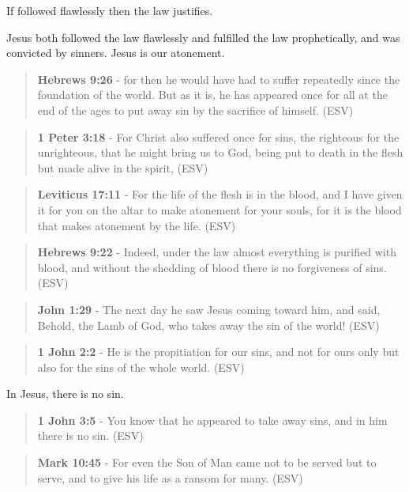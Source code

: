 \documentclass[11pt]{article}
\begin{document}
If followed flawlessly then the law justifies.

Jesus both followed the law flawlessly and fulfilled the law prophetically, and was convicted by sinners. Jesus is our atonement.

\begin{quote}
\textbf{Hebrews 9:26} - for then he would have had to suffer repeatedly since the foundation of the world.  But as it is, he has appeared once for all at the end of the ages to put away sin by the sacrifice of himself.  (ESV)
\end{quote}

\begin{quote}
\textbf{1 Peter 3:18} - For Christ also suffered once for sins, the righteous for the unrighteous, that he might bring us to God, being put to death in the flesh but made alive in the spirit,  (ESV)
\end{quote}

\begin{quote}
\textbf{Leviticus 17:11} - For the life of the flesh is in the blood, and I have given it for you on the altar to make atonement for your souls, for it is the blood that makes atonement by the life.  (ESV)
\end{quote}

\begin{quote}
\textbf{Hebrews 9:22} - Indeed, under the law almost everything is purified with blood, and without the shedding of blood there is no forgiveness of sins.  (ESV)
\end{quote}

\begin{quote}
\textbf{John 1:29} - The next day he saw Jesus coming toward him, and said, Behold, the Lamb of God, who takes away the sin of the world!  (ESV)
\end{quote}

\begin{quote}
\textbf{1 John 2:2} - He is the propitiation for our sins, and not for ours only but also for the sins of the whole world.  (ESV)
\end{quote}

In Jesus, there is no sin.

\begin{quote}
\textbf{1 John 3:5} - You know that he appeared to take away sins, and in him there is no sin.  (ESV)
\end{quote}

\begin{quote}
\textbf{Mark 10:45} -  For even the Son of Man came not to be served but to serve, and to give his life as a ransom for many.  (ESV)
\end{quote}
\end{document}
